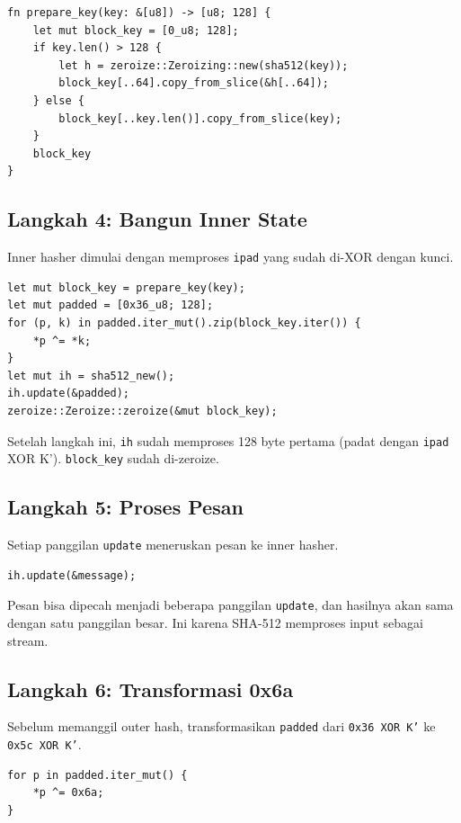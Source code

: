 \documentclass[11pt,a4paper]{article}
\begin{document}
\begin{lstlisting}[style=code]
fn prepare_key(key: &[u8]) -> [u8; 128] {
    let mut block_key = [0_u8; 128];
    if key.len() > 128 {
        let h = zeroize::Zeroizing::new(sha512(key));
        block_key[..64].copy_from_slice(&h[..64]);
    } else {
        block_key[..key.len()].copy_from_slice(key);
    }
    block_key
}
\end{lstlisting}

\subsection{Langkah 4: Bangun Inner State}

Inner hasher dimulai dengan memproses \texttt{ipad} yang sudah di-XOR dengan kunci.

\begin{lstlisting}[style=code]
let mut block_key = prepare_key(key);
let mut padded = [0x36_u8; 128];
for (p, k) in padded.iter_mut().zip(block_key.iter()) {
    *p ^= *k;
}
let mut ih = sha512_new();
ih.update(&padded);
zeroize::Zeroize::zeroize(&mut block_key);
\end{lstlisting}

Setelah langkah ini, \texttt{ih} sudah memproses 128 byte pertama (padat dengan \texttt{ipad} XOR K'). \texttt{block\_key} sudah di-zeroize.

\subsection{Langkah 5: Proses Pesan}

Setiap panggilan \texttt{update} meneruskan pesan ke inner hasher.

\begin{lstlisting}[style=code]
ih.update(&message);
\end{lstlisting}

Pesan bisa dipecah menjadi beberapa panggilan \texttt{update}, dan hasilnya akan sama dengan satu panggilan besar. Ini karena SHA-512 memproses input sebagai stream.

\subsection{Langkah 6: Transformasi 0x6a}

Sebelum memanggil outer hash, transformasikan \texttt{padded} dari \texttt{0x36 XOR K'} ke \texttt{0x5c XOR K'}.

\begin{lstlisting}[style=code]
for p in padded.iter_mut() {
    *p ^= 0x6a;
}
\end{lstlisting}
\end{document}
